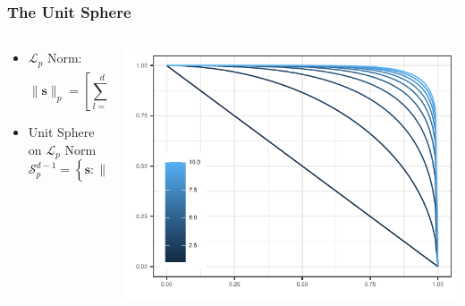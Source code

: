 \documentclass[aspectratio=169]{beamer}
\begin{document}
\begin{frame}
  \frametitle{The Unit Sphere}
  \begin{columns}
    \begin{column}{.38\textwidth}
      \begin{itemize}
        \item $\mathcal{L}_p$ Norm:
          \begin{equation*}
            \lVert \bm{s}\rVert_p = \left[\sum_{l = 1}^ds_l^p\right]^{\frac{1}{p}}
          \end{equation*}
        \pause
        \item Unit Sphere on $\mathcal{L}_p$ Norm
          \begin{equation*}
            \mathcal{S}_{p}^{d-1} = \left\lbrace \bm{s} : \lVert\bm{s}\rVert_p = 1 \right\rbrace
          \end{equation*}
      \end{itemize}
    \end{column}%
    \hfill%
    \pause
    \begin{column}{.58\textwidth}
      \begin{center}
        \includegraphics[width = \linewidth, height = \linewidth]{./images/p_sphere}
      \end{center}
    \end{column}%
  \end{columns}%
\end{frame}
\end{document}
